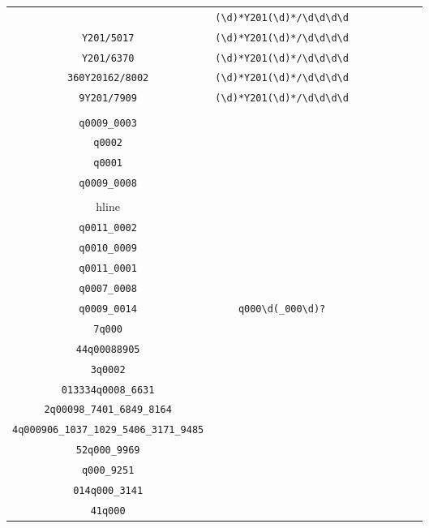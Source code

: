 \begin{longtable}{cccccccc}
\begin{tabular}{ll}
    \verb|Y201/6218| & \verb|(\d)*Y201(\d)*/\d\d\d\d|\\
\verb|Y201/5017| & \verb|(\d)*Y201(\d)*/\d\d\d\d|\\
\verb|Y201/6370| & \verb|(\d)*Y201(\d)*/\d\d\d\d|\\
\verb|360Y20162/8002| & \verb|(\d)*Y201(\d)*/\d\d\d\d|\\
\verb|9Y201/7909| & \verb|(\d)*Y201(\d)*/\d\d\d\d|
\end{tabular}
\\\midrule 
\begin{tabular}{l}
    \verb|q0005_0003|\\
\verb|q0009_0003|\\
\verb|q0002|\\
\verb|q0001|\\
\verb|q0009_0008|\\
\\hline\\
\verb|q0011_0002|\\
\verb|q0010_0009|\\
\verb|q0011_0001|\\
\verb|q0007_0008|\\
\verb|q0009_0014|
\end{tabular}

&
\verb|q000\d(_000\d)?|
&

\begin{tabular}{l}
    \verb|(\d)*q000(\d)*(_\d\d\d\d)*|\\
\verb|7q000|\\
\verb|44q00088905|\\
\verb|3q0002|\\
\verb|013334q0008_6631|\\
\verb|2q00098_7401_6849_8164|
\end{tabular}

&

\begin{tabular}{l}
    \verb|(\d)*q000(\d)*(_\d\d\d\d)*|\\
\verb|4q000906_1037_1029_5406_3171_9485|\\
\verb|52q000_9969|\\
\verb|q000_9251|\\
\verb|014q000_3141|\\
\verb|41q000|
\end{tabular}

&


\end{longtable}
